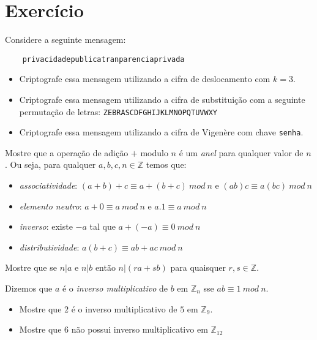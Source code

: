 \section{Exercício}
\label{sec:exercicio}

\begin{exercicio}
  Considere a seguinte mensagem:
  \begin{verbatim}
    privacidadepublicatranparenciaprivada
  \end{verbatim}
  \begin{itemize}
  \item Criptografe essa mensagem utilizando a cifra de deslocamento com $k = 3$.
  \item Criptografe essa mensagem utilizando a cifra de substituição com a seguinte permutação de letras: {\tt ZEBRASCDFGHIJKLMNOPQTUVWXY}
  \item Criptografe essa mensagem utilizando a cifra de Vigenère com chave {\tt senha}.
  \end{itemize}
\end{exercicio}


\begin{exercicio}
  Mostre que a operação de adição $+$ modulo $n$ é um {\em anel} para qualquer valor de $n$.
Ou seja, para qualquer $a, b, c, n \in \mathbb{Z}$ temos que:
\begin{itemize}
\item {\em associatividade}: $(a+b)+c \equiv a+(b+c)\ mod\ n$ e $(ab)c \equiv a(bc)\ mod\ n$
\item {\em elemento neutro}: $a + 0 \equiv a\ mod\ n$ e $a.1 \equiv a\ mod\ n$
\item {\em inverso}: existe $-a$ tal que $a + (-a) \equiv 0\ mod\ n$
\item {\em distributividade}: $a(b + c) \equiv ab + ac\ mod\ n$
\end{itemize}
\end{exercicio}

\begin{exercicio}
  Mostre que se $n|a$ e $n|b$ então $n|(ra + sb)$ para quaisquer $r, s \in \mathbb{Z}$.
\end{exercicio}

\begin{exercicio}
  Dizemos que $a$ é o {\em inverso multiplicativo} de $b$ em $\mathbb{Z}_n$ sse $ab \equiv 1\ mod\ n$.
\begin{itemize}
\item Mostre que $2$ é o inverso multiplicativo de $5$ em $\mathbb{Z}_9$.
\item Mostre que $6$ não possui inverso multiplicativo em $\mathbb{Z}_{12}$
\end{itemize}
\end{exercicio}

